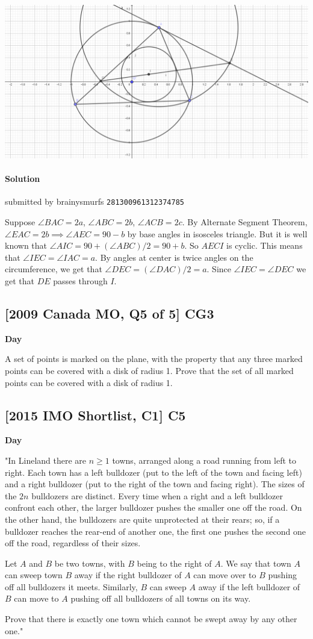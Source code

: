 \documentclass[10pt]{article}
\newcommand{\themonth}{March}
\newcommand{\theyear}{2019}
\newcounter{day}
\newcounter{solution}
\newcounter{datenumber}
\newcommand{\problem}[4][0]{
	\newpage
	\subsection{[#3] \space #2} \hfill 
	{\large\textbf{Day \arabic{day}}} %
	\begin{flushleft} #4 \end{flushleft}
	\vspace{1em}
	\addtocounter{day}{1}
	\addtocounter{datenumber}{1}
	\setcounter{solution}{1}
}
\newcommand{\solution}[4][0]{
	\paragraph{Solution \arabic{solution}} \hfill submitted by #2 \hfill \texttt{#3}
	\begin{flushleft} #4 \end{flushleft}
	\addtocounter{solution}{1}
	\vspace{1em}
}
\begin{document}
\begin{center}
	\includegraphics[scale=0.25]{q47-diagram}
\end{center}

\solution[47]{brainysmurfs}{281300961312374785}{Suppose $\angle BAC = 2a$, $\angle ABC = 2b$, $\angle ACB = 2c$. By Alternate Segment Theorem, $\angle EAC = 2b \implies \angle AEC = 90 - b$ by base angles in isosceles triangle. But it is well known that $\angle AIC = 90 + (\angle ABC)/2 = 90 + b$. So $AECI$ is cyclic. This means that $\angle IEC = \angle IAC = a$. By angles at center is twice angles on the circumference, we get that $\angle DEC = (\angle DAC)/2 = a$. Since $\angle IEC = \angle DEC$ we get that $DE$ passes through $I$.}

\problem[48]{CG3}{2009 Canada MO, Q5 of 5}{A set of points is marked on the plane, with the property that any three marked points can be covered with a disk of radius 1. Prove that the set of all marked points can be covered with a disk of radius 1.}

\problem[49]{C5}{2015 IMO Shortlist, C1}{"In Lineland there are \(n \geq 1\) towns, arranged along a road running from left to right. Each town has a left bulldozer (put to the left of the town and facing left) and a right bulldozer (put to the right of the town and facing right). The sizes of the \(2n\) bulldozers are distinct. Every time when a right and a left bulldozer confront each other, the larger bulldozer pushes the smaller one off the road. On the other hand, the bulldozers are quite unprotected at their rears; so, if a bulldozer reaches the rear-end of another one, the first one pushes the second one off the road, regardless of their sizes.
	
	\quad Let \(A\) and \(B\) be two towns, with \(B\) being to the right of \(A\). We say that town \(A\) can sweep town \(B\) away if the right bulldozer of \(A\) can move over to \(B\) pushing off all bulldozers it meets. Similarly, \(B\) can sweep \(A\) away if the left bulldozer of \(B\) can move to \(A\) pushing off all bulldozers of all towns on its way.
	
	\quad Prove that there is exactly one town which cannot be swept away by any other one."}
\end{document}
